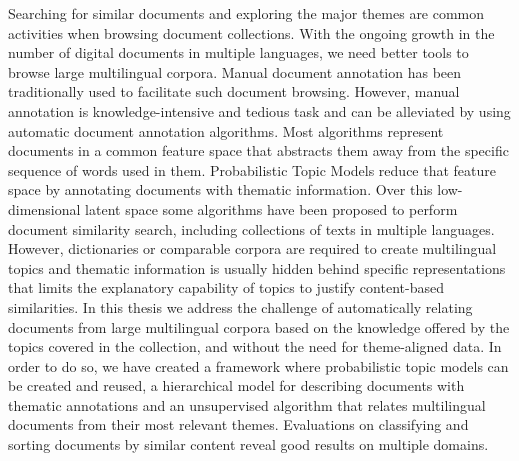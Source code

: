 


\begin{abstractslong}  
Searching for similar documents and exploring the major themes are common activities when browsing document collections. With the ongoing growth in the number of digital documents in multiple languages, we need better tools to browse large multilingual corpora. Manual document annotation has been traditionally used to facilitate such document browsing. However, manual annotation is knowledge-intensive and tedious task and can be alleviated by using automatic document annotation algorithms. Most  algorithms represent documents in a common feature space that abstracts them away from the specific sequence of words used in them. Probabilistic Topic Models reduce that feature space by annotating documents with thematic information. Over this low-dimensional latent space some algorithms have been proposed to perform document similarity search, including collections of texts in multiple languages. However, dictionaries or comparable corpora are required to create multilingual topics and thematic information is usually hidden behind specific representations that limits the explanatory capability of topics to justify content-based similarities. In this thesis we address the challenge of automatically relating documents from large multilingual corpora based on the knowledge offered by the topics covered in the collection, and without the need for theme-aligned data. In order to do so, we have created a framework where probabilistic topic models can be created and reused, a hierarchical model for describing documents with thematic annotations and an unsupervised algorithm that relates multilingual documents from their most relevant themes. Evaluations on classifying and sorting documents by similar content reveal good results on multiple domains.


\end{abstractslong}

